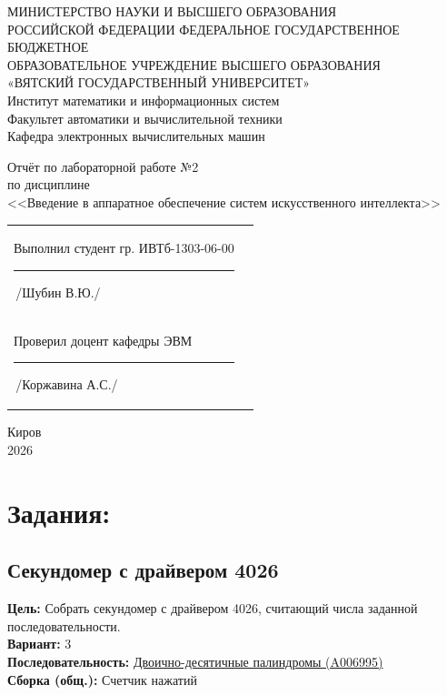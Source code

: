 \documentclass[oneside,a4paper,14pt]{extarticle} %
\begin{document}
\newpage\thispagestyle{empty}
\begin{center}
	МИНИСТЕРСТВО НАУКИ И ВЫСШЕГО ОБРАЗОВАНИЯ\\
	РОССИЙСКОЙ ФЕДЕРАЦИИ
	ФЕДЕРАЛЬНОЕ ГОСУДАРСТВЕННОЕ БЮДЖЕТНОЕ\\
	ОБРАЗОВАТЕЛЬНОЕ
	УЧРЕЖДЕНИЕ ВЫСШЕГО ОБРАЗОВАНИЯ\\
	«ВЯТСКИЙ ГОСУДАРСТВЕННЫЙ УНИВЕРСИТЕТ»\\
	Институт математики и информационных систем\\
	Факультет автоматики и вычислительной техники\\
	Кафедра электронных вычислительных машин
\end{center}
\vspace{30mm}

\begin{center}
	Отчёт по лабораторной работе №2\\
	по дисциплине\\
	<<Введение в аппаратное обеспечение систем искусственного интеллекта>>\\

\end{center}
\vspace{40mm}

\noindent
\begin{tabular}{l r}

	Выполнил студент гр. ИВТб-1303-06-00
	\hspace{15mm} \rule[-1mm]{30mm}{0.15mm}\,/Шубин В.Ю./ \\ %


	Проверил доцент кафедры ЭВМ \hfill
	\rule[-1mm]{30mm}{0.15mm}\,/Коржавина А.С./
\end{tabular}

\vfill
\begin{center}
	Киров\\
	2026
\end{center}



\newpage\thispagestyle{empty}


\section{Задания:}
    
    \subsection[short]{Секундомер с драйвером 4026}
    \textbf{Цель:} Собрать секундомер с драйвером 4026, считающий числа заданной последовательности.\\
    \textbf{Вариант:} 3\\
    \textbf{Последовательность:} \href{https://oeis.org/search?q=A006995&language=english&go=Search}{Двоично-десятичные палиндромы (A006995)}\\
    \textbf{Сборка (общ.):} Счетчик нажатий\\
      
\end{document}
